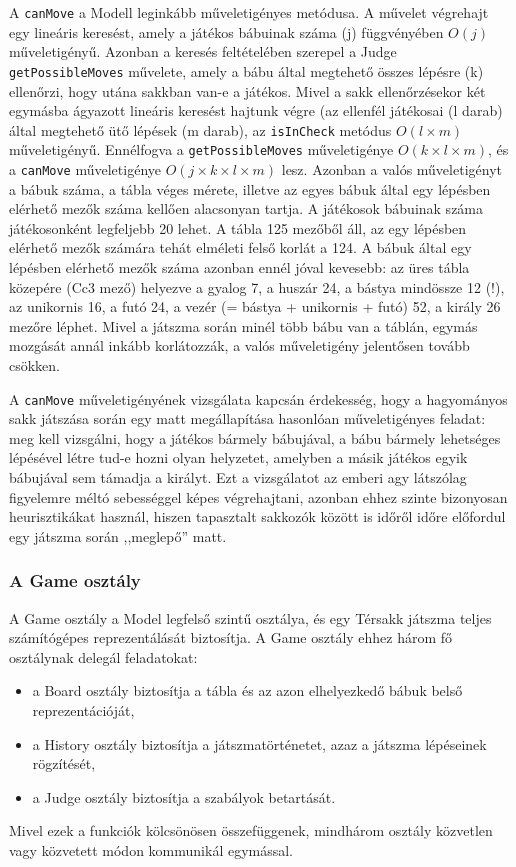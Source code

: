 \documentclass[12pt, twoside]{report}
\begin{document}
\begin{itemize}
	A {\tt canMove} a Modell leginkább műveletigényes metódusa. A művelet végrehajt egy lineáris keresést, amely a játékos bábuinak száma (j) függvényében $O(j)$ műveletigényű. Azonban a keresés feltételében szerepel a Judge {\tt getPossibleMoves} művelete, amely a bábu által megtehető összes lépésre (k) ellenőrzi, hogy utána sakkban van-e a játékos. Mivel a sakk ellenőrzésekor két egymásba ágyazott lineáris keresést hajtunk végre (az ellenfél játékosai (l darab) által megtehető ütő lépések (m darab), az {\tt isInCheck} metódus $O(l \times m)$ műveletigényű. Ennélfogva a {\tt getPossibleMoves} műveletigénye $O(k \times l \times m)$, és a {\tt canMove} műveletigénye $O(j \times k \times l \times m)$ lesz. Azonban a valós műveletigényt a bábuk száma, a tábla véges mérete, illetve az egyes bábuk által egy lépésben elérhető mezők száma kellően alacsonyan tartja. A játékosok bábuinak száma játékosonként legfeljebb 20 lehet. A tábla 125 mezőből áll, az egy lépésben elérhető mezők számára tehát elméleti felső korlát a 124. A bábuk által egy lépésben elérhető mezők száma azonban ennél jóval kevesebb: az üres tábla közepére (Cc3 mező) helyezve a gyalog 7, a huszár 24, a bástya mindössze 12 (!), az unikornis 16, a futó 24, a vezér (= bástya + unikornis + futó) 52, a király 26 mezőre léphet. Mivel a játszma során minél több bábu van a táblán, egymás mozgását annál inkább korlátozzák, a valós műveletigény jelentősen tovább csökken. 
	
	A {\tt canMove} műveletigényének vizsgálata kapcsán érdekesség, hogy a hagyományos sakk játszása során egy matt megállapítása hasonlóan műveletigényes feladat: meg kell vizsgálni, hogy a játékos bármely bábujával, a bábu bármely lehetséges lépésével létre tud-e hozni olyan helyzetet, amelyben a másik játékos egyik bábujával sem támadja a királyt. Ezt a vizsgálatot az emberi agy látszólag figyelemre méltó sebességgel képes végrehajtani, azonban ehhez szinte bizonyosan heurisztikákat használ, hiszen tapasztalt sakkozók között is időről időre előfordul egy játszma során ,,meglepő'' matt.
\end{itemize}

\subsubsection{A Game osztály}

A Game osztály a Model legfelső szintű osztálya, és egy Térsakk játszma teljes számítógépes reprezentálását biztosítja. A Game osztály ehhez három fő osztálynak delegál feladatokat:
\begin{itemize}
	\item a Board osztály biztosítja a tábla és az azon elhelyezkedő bábuk belső reprezentációját,
	\item a History osztály biztosítja a játszmatörténetet, azaz a játszma lépéseinek rögzítését,
	\item a Judge osztály biztosítja a szabályok betartását.
\end{itemize}
Mivel ezek a funkciók kölcsönösen összefüggenek, mindhárom osztály közvetlen vagy közvetett módon kommunikál egymással.
\end{document}
